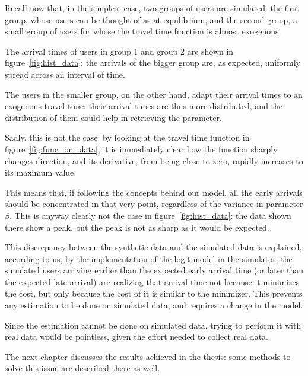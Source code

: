 Recall now that, in the simplest case, two groups of users are simulated:
the first group, whose users can be thought of as at equilibrium,
and the second group,
a small group of users for whose the travel time function is almost exogenous.

The arrival times of users in group 1 and group 2 are shown in figure~\ref{fig:hist_data}:
the arrivals of the bigger group are, as expected,
uniformly spread across an interval of time.

The users in the smaller group, on the other hand,
adapt their arrival times to an exogenous travel time:
their arrival times are thus more distributed,
and the distribution of them could help in retrieving the parameter.

Sadly, this is not the case:
by looking at the travel time function in figure~\ref{fig:func_on_data},
it is immediately clear how the function sharply changes direction,
and its derivative, from being close to zero,
rapidly increases to its maximum value.

This means that,
if following the concepts behind our model,
all the early arrivals should be concentrated in that very point,
regardless of the variance in parameter \(\beta\).
This is anyway clearly not the case in figure~\ref{fig:hist_data}:
the data shown there show a peak, but the peak is not as sharp as it would be expected.

This discrepancy between the synthetic data and the simulated data is explained,
according to us,
by the implementation of the logit model in the simulator:
the simulated users arriving earlier than the expected early arrival time
(or later than the expected late arrival)
are realizing that arrival time not because it minimizes the cost,
but only because the cost of it is similar to the minimizer.
This prevents any estimation to be done on simulated data, and requires a change in the model.

Since the estimation cannot be done on simulated data,
trying to perform it with real data would be pointless,
given the effort needed to collect real data.

The next chapter discusses the results achieved in the thesis:
some methods to solve this issue are described there as well.

